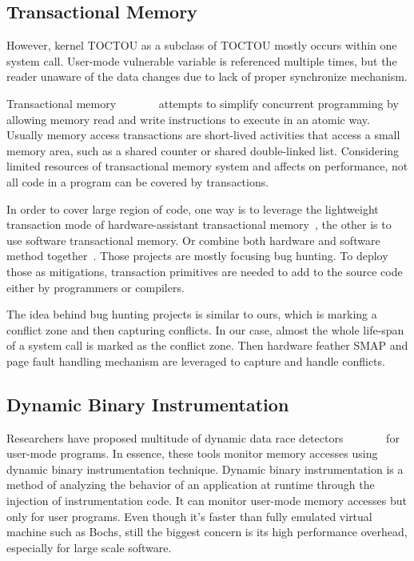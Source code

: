 \subsection{Transactional Memory}

However, kernel TOCTOU as a subclass of TOCTOU mostly occurs within one system call. User-mode vulnerable variable is referenced multiple times, but the reader unaware of the data changes due to lack of proper synchronize mechanism. 

Transactional memory~\cite{herlihy1993transactional}~\cite{shavit1997software}~\cite{rajwar2012intel}~\cite{haring2012ibm}~\cite{jacobi2012transactional}~\cite{click2009azul}~\cite{dice2009early} attempts to simplify concurrent programming by allowing memory read and write instructions to execute in an atomic way. Usually memory access transactions are short-lived activities that access a small memory area, such as a shared counter or shared double-linked list. Considering limited resources of transactional memory system and affects on performance, not all code in a program can be covered by transactions. 

In order to cover large region of code, one way is to leverage the lightweight transaction mode of hardware-assistant transactional memory~\cite{gupta2009using}, the other is to use software transactional memory\cite{kestor2014trex}. Or combine both hardware and software method together~\cite{zhang2016txrace}. Those projects are mostly focusing bug hunting. To deploy those as mitigations, transaction primitives are needed to add to the source code either by programmers or compilers.

The idea behind bug hunting projects is similar to ours, which is marking a conflict zone and then capturing conflicts. In our case, almost the whole life-span of a system call is marked as the conflict zone. Then hardware feather SMAP and page fault handling mechanism are leveraged to capture and handle conflicts.

\subsection{Dynamic Binary Instrumentation}

Researchers have proposed multitude of dynamic data race
detectors~\cite{savage1997eraser}~\cite{o2003hybrid}~\cite{yu2005racetrack}~\cite{bond2010pacer}~\cite{marino2009literace}~\cite{flanagan2009fasttrack}~\cite{pozniansky2007multirace} for user-mode programs. In essence, these tools monitor memory accesses using dynamic binary instrumentation technique. Dynamic binary instrumentation is a method of analyzing the behavior of an application at runtime through the injection of instrumentation code. It can monitor user-mode memory accesses but only for user programs. Even though it's faster than fully emulated virtual machine such as Bochs, still the biggest concern is its high performance overhead, especially for large scale software.

